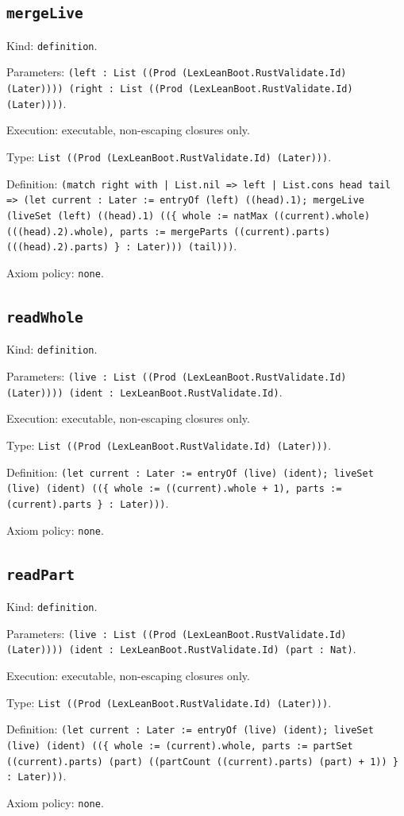 \documentclass[11pt]{article}
\begin{document}
\subsection*{\texttt{mergeLive}}
\noindent Kind: \texttt{definition}.\par
\noindent Parameters: \texttt{(left : List ((Prod (LexLeanBoot.RustValidate.Id) (Later)))) (right : List ((Prod (LexLeanBoot.RustValidate.Id) (Later))))}.\par
\noindent Execution: executable, non-escaping closures only.\par
\noindent Type: \texttt{List ((Prod (LexLeanBoot.RustValidate.Id) (Later)))}.\par
\noindent Definition: \texttt{(match right with | List.nil => left | List.cons head tail => (let current : Later := entryOf (left) ((head).1); mergeLive (liveSet (left) ((head).1) ((\{ whole := natMax ((current).whole) (((head).2).whole), parts := mergeParts ((current).parts) (((head).2).parts) \} : Later))) (tail)))}.\par
\noindent Axiom policy: \texttt{none}.\par
\subsection*{\texttt{readWhole}}
\noindent Kind: \texttt{definition}.\par
\noindent Parameters: \texttt{(live : List ((Prod (LexLeanBoot.RustValidate.Id) (Later)))) (ident : LexLeanBoot.RustValidate.Id)}.\par
\noindent Execution: executable, non-escaping closures only.\par
\noindent Type: \texttt{List ((Prod (LexLeanBoot.RustValidate.Id) (Later)))}.\par
\noindent Definition: \texttt{(let current : Later := entryOf (live) (ident); liveSet (live) (ident) ((\{ whole := ((current).whole + 1), parts := (current).parts \} : Later)))}.\par
\noindent Axiom policy: \texttt{none}.\par
\subsection*{\texttt{readPart}}
\noindent Kind: \texttt{definition}.\par
\noindent Parameters: \texttt{(live : List ((Prod (LexLeanBoot.RustValidate.Id) (Later)))) (ident : LexLeanBoot.RustValidate.Id) (part : Nat)}.\par
\noindent Execution: executable, non-escaping closures only.\par
\noindent Type: \texttt{List ((Prod (LexLeanBoot.RustValidate.Id) (Later)))}.\par
\noindent Definition: \texttt{(let current : Later := entryOf (live) (ident); liveSet (live) (ident) ((\{ whole := (current).whole, parts := partSet ((current).parts) (part) ((partCount ((current).parts) (part) + 1)) \} : Later)))}.\par
\noindent Axiom policy: \texttt{none}.\par
\end{document}
